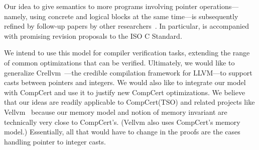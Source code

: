 Our idea to give semantics to more programs involving pointer operations---namely, using concrete
and logical blocks at the same time---is subsequently refined by follow-up papers by other
researchers~\cite{intptrcast-oopsla,intptrcast-popl}.  In particular, \cite{intptrcast-popl} is
accompanied with promising revision proposals to the ISO C Standard.


We intend to use this model for compiler verification tasks, extending the range of common
optimizations that can be verified.  Ultimately, we would like to generalize
Crellvm~\cite{crellvm}---the credible compilation framework for LLVM---to support casts between
pointers and integers.  We would also like to integrate our model with CompCert and use it to
justify new CompCert optimizations.  We believe that our ideas are readily applicable to
CompCert(TSO) and related projects like Vellvm~\cite{vellvm:popl12,vellvm:pldi13} because our memory
model and notion of memory invariant are technically very close to CompCert's.  (Vellvm also uses
CompCert's memory model.)  Essentially, all that would have to change in the proofs are the cases
handling pointer to integer casts.








